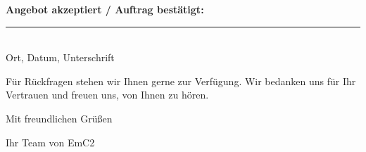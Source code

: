 \documentclass[a4paper,11pt]{article}
\begin{document}
\vspace{0.8cm}

\textbf{Angebot akzeptiert / Auftrag bestätigt:}

\vspace{2cm}

\noindent
\parbox{6cm}{
    \rule{6cm}{0.4pt}\\
    Ort, Datum, Unterschrift
}

\vspace{1cm}

Für Rückfragen stehen wir Ihnen gerne zur Verfügung. Wir bedanken uns für Ihr Vertrauen und freuen uns, von Ihnen zu hören.

\vspace{0.6cm}

Mit freundlichen Grüßen

\vspace{0.4cm}

Ihr Team von EmC2
\end{document}
